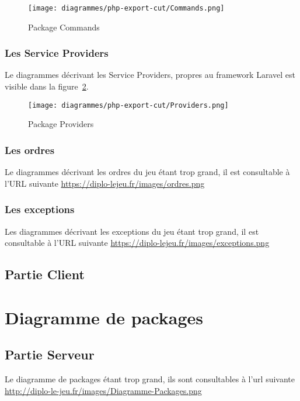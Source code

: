 			\begin{figure}[H]
				\centering
                \texttt{[image: diagrammes/php-export-cut/Commands.png]}
                \caption{\label{pcommands}Package Commands}
			\end{figure}

        \subsubsection{Les Service Providers}
        Le diagrammes décrivant les Service Providers, propres au framework Laravel est visible dans la figure~\ref{pproviders}.

			\begin{figure}[H]
				\centering
                \texttt{[image: diagrammes/php-export-cut/Providers.png]}
                \caption{\label{pproviders}Package Providers}
			\end{figure}

		\subsubsection{Les ordres}
        Le diagrammes décrivant les ordres du jeu étant trop grand, il est consultable à l'URL suivante \url{https://diplo-lejeu.fr/images/ordres.png}

		\subsubsection{Les exceptions}
        Les diagrammes décrivant les exceptions du jeu étant trop grand, il est consultable à l'URL suivante \url{https://diplo-lejeu.fr/images/exceptions.png}

    \pagebreak
	\subsection{Partie Client}

\section{Diagramme de packages}
	\subsection{Partie Serveur}

        Le diagramme de packages étant trop grand, ils sont consultables à l'url suivante \url{http://diplo-le-jeu.fr/images/Diagramme-Packages.png} 

